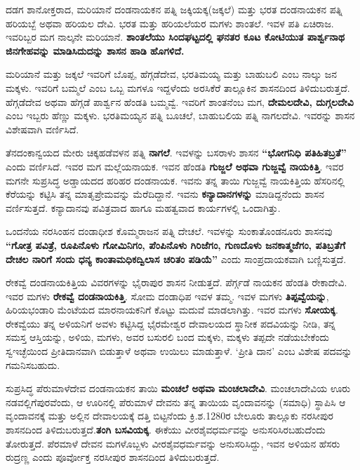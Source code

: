 ದಡಗ ಶಾನೋಕ್ತರಾದ, ಮರಿಯಾನೆ ದಂಡನಾಯಕನ ಪತ್ನಿ ಜಕ್ಕಿಯಕ್ಕ(ಜಕ್ಕಲೆ) ಮತ್ತು ಭರತ ದಂಡನಾಯಕನ ಪತ್ನಿ ಹರಿಯಬ್ಬೆ ಅಥವಾ ಹರಿಯಲ ದೇವಿ. ಭರತ ಮತ್ತು ಹರಿಯಲೆಯರ ಮಗಳು ಶಾಂತಲೆ. ಇವಳ ಪತಿ ಏಚಿರಾಜ. ಇವರಿಬ್ಬರ ಮಗ ನಾಲ್ಕನೇ ಮರಿಯಾನೆ. \textbf{ಶಾಂತಲೆಯು ಸಿಂದಘಟ್ಟದಲ್ಲಿ ಘನತರ ಕೂಟ ಕೋಟಿಯುತ ಪಾರ್ಶ್ವನಾಥ ಜಿನಗೇಹವನ್ನು ಮಾಡಿಸಿದುದನ್ನು ಶಾಸನ ಹಾಡಿ ಹೊಗಳಿದೆ.}

ಮರಿಯಾನೆ ಮತ್ತು ಜಕ್ಕಲೆ ಇವರಿಗೆ ಬೊಪ್ಪ, ಹೆಗ್ಗಡೆದೇವ, ಭರತಿಮಯ್ಯ ಮತ್ತು ಬಾಹುಬಲಿ ಎಂಬ ನಾಲ್ಕು ಜನ ಮಕ್ಕಳು. ಇವರಿಗೆ ಬಮ್ಮಲೆ ಎಂಬ ಒಬ್ಬ ಮಗಳೂ ಇದ್ದಳೆಂದು ಅರಸಿಕೆರೆ ತಾಲ್ಲೂಕಿನ ಶಾಸನದಿಂದ ತಿಳಿದುಬರುತ್ತದೆ. ಹೆಗ್ಗಡೆದೇವ ಅಥವಾ ಹೆಗ್ಗಡೆ ಪಾರ್ಶ್ವನ ಹೆಂಡತಿ ಬಮ್ಮವ್ವೆ. ಇವರಿಗೆ ಶಾಂತನೆಂಬ ಮಗ, \textbf{ದೇಮಲದೇವಿ, ದುಗ್ಗಲದೇವಿ} ಎಂಬ ಇಬ್ಬರು ಹೆಣ್ಣು ಮಕ್ಕಳು. ಭರತಿಮಯ್ಯನ ಪತ್ನಿ ಬೂಚಲೆ, ಬಾಹುಬಲಿಯ ಪತ್ನಿ ನಾಗಲದೇವಿ. ಇವರನ್ನು ಶಾಸನ ವಿಶೇಷವಾಗಿ ವರ್ಣಿಸಿದೆ.

ತೆನದಂಕಾನ್ವಯದ ಮೇರು ಚಿಕ್ಕಹಡೆವಳನ ಪತ್ನಿ \textbf{ನಾಗಲೆ}. ಇವಳನ್ನು ಬಸರಾಳು ಶಾಸನ \textbf{“ಭೋಗನಿಧಿ ಪತಿಹಿತಬ್ರತೆ”} ಎಂದು ವರ್ಣಿಸಿದೆ. ಇವರ ಮಗ ಮಲ್ಲೆಯನಾಯಕ. ಇವನ ಹೆಂಡತಿ \textbf{ಗುಜ್ಜಲೆ ಅಥವಾ ಗುಜ್ಜವ್ವೆ ನಾಯಕಿತ್ತಿ}. ಇವರ ಮಗನೇ ಸುಪ್ರಸಿದ್ಧ ಅಡ್ಡಾಯದದ ಹರಿಹರ ದಂಡನಾಯಕ. ಇವನು ತನ್ನ ತಾಯಿ ಗುಜ್ಜವ್ವೆ ನಾಯಕಿತ್ತಿಯ ಹೆಸರಿನಲ್ಲಿ ಕೆರೆಯನ್ನು ಕಟ್ಟಿಸಿ ತನ್ನ ಮಾತೃಪ್ರೇಮವನ್ನು ಮೆರೆದಿದ್ದಾನೆ. ಇವನು \textbf{ಕನ್ಯಾದಾನಗಳನ್ನು} ಮಾಡಿದ್ದನೆಂದು ಶಾಸನ ವರ್ಣಿಸುತ್ತದೆ. ಕನ್ಯಾದಾನವು ಪವಿತ್ರವಾದ ಹಾಗೂ ಮಹತ್ವವಾದ ಕಾರ್ಯಗಳಲ್ಲಿ ಒಂದಾಗಿತ್ತು.

ಒಂದನೆಯ ನರಸಿಂಹನ ದಂಡಾಧೀಶ ಕೊಮ್ಮರಾಜನ ಪತ್ನಿ ದೇಚಲೆ. ಇವಳನ್ನು ಸುಂಕಾತೊಂಡನೂರು ಶಾಸನವು \textbf{“ಗೋತ್ರ ಪವಿತ್ರೆ, ರೂಪಿನೊಳು ಗೋಮಿನಿಗಂ, ಪೆಂಪಿನೊಳು ಗಿರಿಜೆಗಂ, ಗುಣದೊಳು ಜನಕಾತ್ಮಜೆಗಂ, ಪತಿಬ್ರತೆಗೆ ದೇಚಲ ನಾರಿಗೆ ಸಂದು ಧನ್ಯ ಕಾಂತಾಮಧಿಕದ್ವಿಲಾಸ ಚರಿತಂ ಪಡಿಯೆ”} ಎಂದು ಸಾಂಪ್ರದಾಯಕವಾಗಿ ಬಣ್ಣಿಸುತ್ತದೆ.

ರೇಕವ್ವೆ ದಂಡನಾಯಕಿತ್ತಿಯ ವಿವರಗಳನ್ನು ಭೈರಾಪುರ ಶಾಸನ ನೀಡುತ್ತದೆ. ಪೆರ್ಗ್ಗಡೆ ನಾಯಕನ ಹೆಂಡತಿ ರೇಕಾದೇವಿ. ಇವರ ಮಗಳು \textbf{ರೇಕವ್ವೆ ದಂಡನಾಯಕಿತ್ತಿ}. ಸೋಮ ದಂಡಾಧಿಪ ಇವಳ ತಮ್ಮ. ಇವಳ ಮಗಳು \textbf{ತಿಪ್ಪವ್ವೆಯನ್ನು}, ಹಿರಿಯಭಂಡಾರಿ ಮೆಂಟೆಯದ ಮಾರನಾಯಕನಿಗೆ ಕೊಟ್ಟು ಮದುವೆ ಮಾಡಲಾಗಿತ್ತು. ಇವರ ಮಗಳು \textbf{ಸೋಯಕ್ಕ}. ರೇಕವ್ವೆಯು ತನ್ನ ಅಳಿಯನಿಗೆ ಅವಳು ಕಟ್ಟಿಸಿದ್ದ ಭೈರಮೇಶ್ವರ ದೇವಾಲಯದ ಸ್ಥಾನೀಕ ಪದವಿಯನ್ನು ನೀಡಿ, ತನ್ನ ಸಮಸ್ತ ಆಸ್ತಿಯನ್ನು, ಅಳಿಯ, ಮಗಳು, ಅವರ ಬಸುರಲಿ ಬಂದ ಮಕ್ಕಳು, ಮಕ್ಕಳು ತಪ್ಪದೇ ನಡೆಯಬೇಕೆಂದು ಸ್ವಇಚ್ಛೆಯಿಂದ ಪ್ರೀತಿದಾನವಾಗಿ ಬಿಡುತ್ತಾಳೆ ಅಥವಾ ಉಯಿಲು ಮಾಡುತ್ತಾಳೆ. `ಪ್ರೀತಿ ದಾನ' ಎಂಬ ವಿಶೇಷ ಪದವನ್ನು ಗಮನಿಸಬಹುದು.

ಸುಪ್ರಸಿದ್ಧ ಪೆರುಮಾಳೆದೇವ ದಂಡನಾಯಕನ ತಾಯಿ \textbf{ಮಂಚಲೆ ಅಥವಾ ಮಂಚಲಾದೇವಿ}. ಮಂಚಲಾದೇವಿಯ ಊರು ನಡವಲ್ಲಿಗೆಪುರವೆಂದು, ಆ ಊರಿನಲ್ಲಿ ಪೆರುಮಾಳೆ ದೇವನು ತನ್ನ ತಾಯಿಯ ವೃಂದಾವನನ್ನು (ಸಮಾಧಿ) ಸ್ಥಾಪಿಸಿ ಆ ವೃಂದಾವನಕ್ಕೆ ಮತ್ತು ಅಲ್ಲಿನ ದೇವಾಲಯಕ್ಕೆ ದತ್ತಿ ಬಿಟ್ಟನೆಂದು ಕ್ರಿ.ಶ.1280ರ ಬೇಲೂರು ತಾಲ್ಲೂಕು ನರಸೀಪುರ ಶಾಸನದಿಂದ ತಿಳಿದುಬರುತ್ತದೆ.\textbf{ತಂಗಿ ಬಸವಿಯಕ್ಕ}. ಈಕೆಯು ವೀರಶೈವಧರ್ಮವನ್ನು ಅನುಸರಿಸಿರಬಹುದೆಂದು ತೋರುತ್ತದೆ. ಪೆರಮಾಳೆ ದೇವನ ಮಗಳೊಬ್ಬಳು ವೀರಶೈವಧರ್ಮವನ್ನು ಅನುಸರಿಸಿದ್ದು, ಇವನ ಅಳಿಯನ ಹೆಸರು ರುದ್ರಣ್ಣ ಎಂದು ಪೂರ್ವೋಕ್ತ ನರಸೀಪುರ ಶಾಸನದಿಂದ ತಿಳಿದುಬರುತ್ತದೆ.

